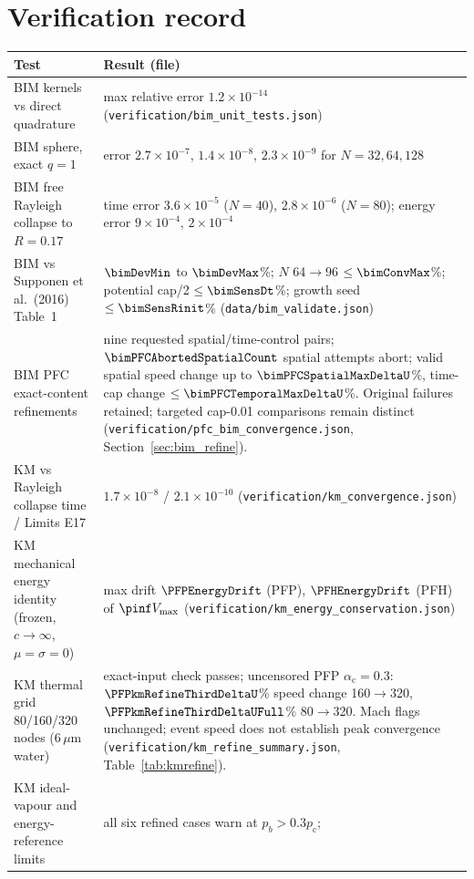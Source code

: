 \section{Verification record}\label{app:verif}
\begin{center}\small
\begin{longtable}{>{\raggedright\arraybackslash}p{}>{\raggedright\arraybackslash}p{}}
\toprule Test & Result (file)\\\midrule\endhead
BIM kernels vs direct quadrature & max relative error $1.2\times10^{-14}$ (\texttt{verification/bim\_unit\_tests.json})\\
BIM sphere, exact $q=1$ & error $2.7\times10^{-7}$, $1.4\times10^{-8}$, $2.3\times10^{-9}$ for $N=32,64,128$\\
BIM free Rayleigh collapse to $R=0.17$ & time error $3.6\times10^{-5}$ ($N=40$), $2.8\times10^{-6}$ ($N=80$);
energy error $9\times10^{-4}$, $2\times10^{-4}$\\
BIM vs Supponen et al.\ (2016) Table~1 & $\bimDevMin$ to $\bimDevMax$\%; $N$ 64$\to$96 $\le\bimConvMax$\%; potential cap/2
$\le\bimSensDt$\%; growth seed $\le\bimSensRinit$\% (\texttt{data/bim\_validate.json})\\
BIM PFC exact-content refinements & nine requested spatial/time-control pairs;
$\bimPFCAbortedSpatialCount$ spatial attempts abort; valid spatial speed change up to
$\bimPFCSpatialMaxDeltaU$\%, time-cap change $\le\bimPFCTemporalMaxDeltaU$\%.
Original failures retained; targeted cap-0.01 comparisons remain distinct
(\texttt{verification/pfc\_bim\_convergence.json}, Section~\ref{sec:bim_refine}).\\
KM vs Rayleigh collapse time / Limits E17 & $1.7\times10^{-8}$ / $2.1\times10^{-10}$ (\texttt{verification/km\_convergence.json})\\
KM mechanical energy identity (frozen, $c\to\infty$, $\mu=\sigma=0$) & max drift $\PFPEnergyDrift$ (PFP),
$\PFHEnergyDrift$ (PFH) of $\pinf V_{\max}$ (\texttt{verification/km\_energy\_conservation.json})\\
KM thermal grid 80/160/320 nodes (6\,$\mu$m water) & exact-input check passes; uncensored PFP
$\alpha_{\mathrm c}=0.3$: $\PFPkmRefineThirdDeltaU$\% speed change 160$\to$320,
$\PFPkmRefineThirdDeltaUFull$\% 80$\to$320. Mach flags unchanged; event speed does not establish peak convergence
(\texttt{verification/km\_refine\_summary.json}, Table~\ref{tab:kmrefine}).\\
KM ideal-vapour and energy-reference limits & all six refined cases warn at $p_b>0.3p_{\mathrm c}$;

\end{longtable}
\end{center}
